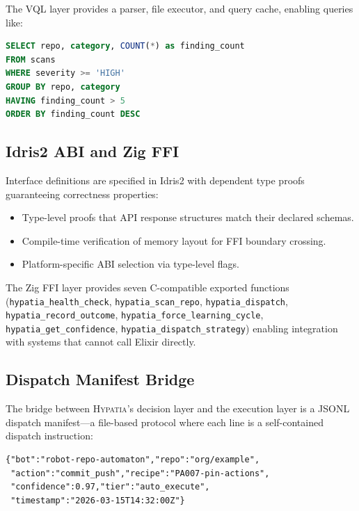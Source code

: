 \documentclass[11pt,a4paper]{article}
\begin{document}
The VQL layer provides a parser, file executor, and query cache, enabling queries like:

\begin{lstlisting}[language=SQL,caption={VQL query for cross-repository pattern analysis.}]
SELECT repo, category, COUNT(*) as finding_count
FROM scans
WHERE severity >= 'HIGH'
GROUP BY repo, category
HAVING finding_count > 5
ORDER BY finding_count DESC
\end{lstlisting}

\subsection{Idris2 ABI and Zig FFI}

Interface definitions are specified in Idris2 with dependent type proofs guaranteeing correctness properties:

\begin{itemize}[nosep]
  \item Type-level proofs that API response structures match their declared schemas.
  \item Compile-time verification of memory layout for FFI boundary crossing.
  \item Platform-specific ABI selection via type-level flags.
\end{itemize}

The Zig FFI layer provides seven C-compatible exported functions (\texttt{hypatia\_health\_check}, \texttt{hypatia\_scan\_repo}, \texttt{hypatia\_dispatch}, \texttt{hypatia\_record\_outcome}, \texttt{hypatia\_force\_learning\_cycle}, \texttt{hypatia\_get\_confidence}, \texttt{hypatia\_dispatch\_strategy}) enabling integration with systems that cannot call Elixir directly.

\subsection{Dispatch Manifest Bridge}

The bridge between \textsc{Hypatia}'s decision layer and the execution layer is a JSONL dispatch manifest---a file-based protocol where each line is a self-contained dispatch instruction:

\begin{lstlisting}[language={},caption={Dispatch manifest entry (JSONL format).}]
{"bot":"robot-repo-automaton","repo":"org/example",
 "action":"commit_push","recipe":"PA007-pin-actions",
 "confidence":0.97,"tier":"auto_execute",
 "timestamp":"2026-03-15T14:32:00Z"}
\end{lstlisting}
\end{document}
